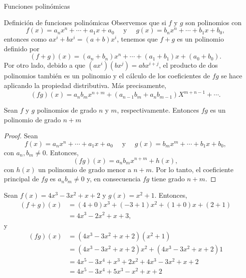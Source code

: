 \begin{chapter}{Funciones polinómicas}
\begin{section}{Definición de funciones polinómicas}
  Observemos que si $f$ y $g$ son polinomios con
  \begin{equation*}
      f(x) = a_nx^n + \cdots + a_1x +a_0 \quad\text{ y } \quad g(x) = b_nx^n +\cdots + b_1x +b_0,
  \end{equation*}
  entonces como $ax^i + b x^i = (a+b)x^i$, tenemos que $f+g$ es un polinomio definido por
  \begin{equation*}
      (f + g)(x) = (a_n+b_n)x^n + \cdots + (a_1+b_1)x +(a_0+b_0).
  \end{equation*}
  Por otro  lado,  debido  a que $(ax^i)(bx^j) = abx^{i+j}$, el producto de dos polinomios también es un polinomio y el cálculo de los coeficientes de $fg$  se hace aplicando la propiedad distributiva. Más precisamente,
  \begin{equation*}
      (fg)(x) = a_nb_m x^{n+m} + (a_{n-1}b_m + a_nb_{m-1})X^{m+n-1} + \cdots.
  \end{equation*}


  \begin{proposicion}
      Sean $f$ y $g$ polinomios de grado $n$ y $m$,  respectivamente. Entonces $fg$ es un  polinomio de grado $n+m$
  \end{proposicion}
  \begin{proof}
      Sean
      \begin{equation*}
          f(x) = a_nx^n + \cdots + a_1x +a_0 \quad\text{ y } \quad g(x) = b_mx^m +\cdots + b_1x +b_0,
      \end{equation*}
      con $a_n, b_m \ne 0$. Entonces,
      \begin{equation}
          (fg)(x) = a_nb_m x^{n+m} + h(x),
      \end{equation}
      con $h(x)$ un polinomio de grado menor a $n+m$. Por lo tanto, el coeficiente principal de $fg$ es $a_nb_m \ne 0$ y,  en consecuencia $fg$ tiene grado $n+m$.
  \end{proof}

  \begin{ejemplo*} Sean $f(x) = 4x^3 - 3x^2 + x + 2$ y $g(x) = x^2 + 1$. Entonces,
      \begin{align*}
          (f+g)(x) & = (4+0)x^3 +(-3 +1)x^2 + (1+0)x + (2+1) \\
                   & = 4x^3 - 2x^2 + x + 3,
      \end{align*}
      y
      \begin{align*}
          (fg)(x) & = (4x^3 - 3x^2 + x + 2)(x^2 + 1)                    \\
                  & = (4x^3 - 3x^2 + x + 2)x^2 + (4x^3 - 3x^2 + x + 2)1 \\
                  & = 4x^5 - 3x^4 + x^3 + 2x^2 + 4x^3 - 3x^2 + x + 2    \\
                  & = 4x^5 - 3x^4 + 5x^3 - x^2 + x + 2
      \end{align*}
  \end{ejemplo*}


\end{section}
\end{chapter}

